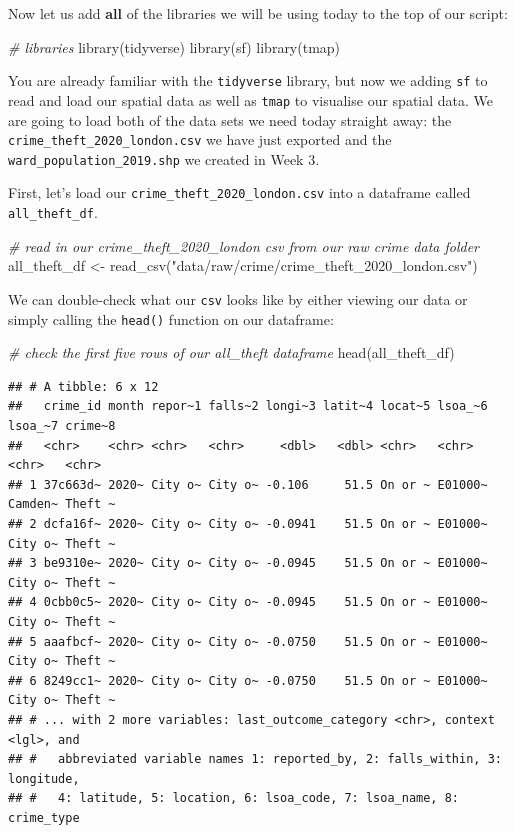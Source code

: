 \documentclass[
]{book}
\newenvironment{Shaded}{\begin{snugshade}}{\end{snugshade}}
\newcommand{\CommentTok}[1]{\textcolor[rgb]{0.56,0.35,0.01}{\textit{#1}}}
\newcommand{\FunctionTok}[1]{\textcolor[rgb]{0.00,0.00,0.00}{#1}}
\newcommand{\NormalTok}[1]{#1}
\newcommand{\OtherTok}[1]{\textcolor[rgb]{0.56,0.35,0.01}{#1}}
\newcommand{\StringTok}[1]{\textcolor[rgb]{0.31,0.60,0.02}{#1}}
\begin{document}
Now let us add \textbf{all} of the libraries we will be using today to the top of our script:

\begin{Shaded}
\begin{Highlighting}[]
\CommentTok{\# libraries}
\FunctionTok{library}\NormalTok{(tidyverse)}
\FunctionTok{library}\NormalTok{(sf)}
\FunctionTok{library}\NormalTok{(tmap)}
\end{Highlighting}
\end{Shaded}

You are already familiar with the \texttt{tidyverse} library, but now we adding \texttt{sf} to read and load our spatial data as well as \texttt{tmap} to visualise our spatial data. We are going to load both of the data sets we need today straight away: the \texttt{crime\_theft\_2020\_london.csv} we have just exported and the \texttt{ward\_population\_2019.shp} we created in Week 3.

First, let's load our \texttt{crime\_theft\_2020\_london.csv} into a dataframe called \texttt{all\_theft\_df}.

\begin{Shaded}
\begin{Highlighting}[]
\CommentTok{\# read in our crime\_theft\_2020\_london csv from our raw crime data folder}
\NormalTok{all\_theft\_df }\OtherTok{\textless{}{-}} \FunctionTok{read\_csv}\NormalTok{(}\StringTok{"data/raw/crime/crime\_theft\_2020\_london.csv"}\NormalTok{)}
\end{Highlighting}
\end{Shaded}

We can double-check what our \texttt{csv} looks like by either viewing our data or simply calling the \texttt{head()} function on our dataframe:

\begin{Shaded}
\begin{Highlighting}[]
\CommentTok{\# check the first five rows of our all\_theft dataframe}
\FunctionTok{head}\NormalTok{(all\_theft\_df)}
\end{Highlighting}
\end{Shaded}

\begin{verbatim}
## # A tibble: 6 x 12
##   crime_id month repor~1 falls~2 longi~3 latit~4 locat~5 lsoa_~6 lsoa_~7 crime~8
##   <chr>    <chr> <chr>   <chr>     <dbl>   <dbl> <chr>   <chr>   <chr>   <chr>  
## 1 37c663d~ 2020~ City o~ City o~ -0.106     51.5 On or ~ E01000~ Camden~ Theft ~
## 2 dcfa16f~ 2020~ City o~ City o~ -0.0941    51.5 On or ~ E01000~ City o~ Theft ~
## 3 be9310e~ 2020~ City o~ City o~ -0.0945    51.5 On or ~ E01000~ City o~ Theft ~
## 4 0cbb0c5~ 2020~ City o~ City o~ -0.0945    51.5 On or ~ E01000~ City o~ Theft ~
## 5 aaafbcf~ 2020~ City o~ City o~ -0.0750    51.5 On or ~ E01000~ City o~ Theft ~
## 6 8249cc1~ 2020~ City o~ City o~ -0.0750    51.5 On or ~ E01000~ City o~ Theft ~
## # ... with 2 more variables: last_outcome_category <chr>, context <lgl>, and
## #   abbreviated variable names 1: reported_by, 2: falls_within, 3: longitude,
## #   4: latitude, 5: location, 6: lsoa_code, 7: lsoa_name, 8: crime_type
\end{verbatim}
\end{document}
